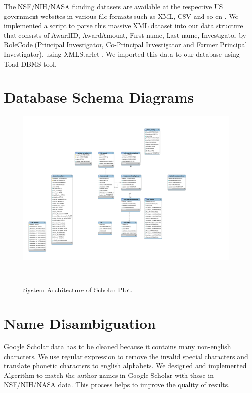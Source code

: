 The NSF/NIH/NASA funding datasets are available at the respective US government websites in various file formats such as XML, CSV and so on \cite{nsf, nih}. We implemented a script to parse this massive XML dataset into our data structure that consists of AwardID, AwardAmount, First name, Last name, Investigator by RoleCode (Principal Investigator, Co-Principal Investigator and Former Principal Investigator), using XMLStarlet \cite{XMLStarlet}. We imported this data to our database using Toad DBMS tool.

\section{Database Schema Diagrams}
\begin{figure}
\centering
  \includegraphics[width=1\columnwidth]{figures/fig_EER_Diagram.pdf}
  \caption{System Architecture of Scholar Plot.}~\label{fig:fig-arch}
\end{figure}





\section{Name Disambiguation}
Google Scholar data has to be cleaned because it contains many non-english characters. We use regular expression to remove the invalid special characters and translate phonetic characters to english alphabets. We designed and implemented Algorithm to match the author names in Google Scholar with those in NSF/NIH/NASA data. This process helps to improve the quality of results. 




